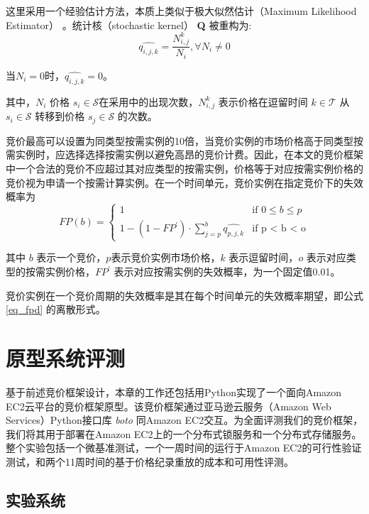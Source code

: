 这里采用一个经验估计方法，本质上类似于极大似然估计（Maximum Likelihood Estimator） \cite{Barbu:2008:SCH:1481376}。统计核（stochastic kernel） \textbf{Q} 被重构为:
\begin{equation}
\widehat{{q}_{i,j,k}} = \frac{N_{i, j}^{k}}{N_i}, \forall N_i \neq 0
\end{equation}

当$N_i = 0$时，$\widehat{{q}_{i,j,k}} = 0$。

其中，$N_i$ 价格 $s_i \in \mathcal{S}$在采用中的出现次数，$N_{i, j}^{k}$ 表示价格在逗留时间 $k \in \mathcal{T}$ 从 $s_i \in \mathcal{S}$ 转移到价格 $s_j \in \mathcal{S}$ 的次数。

竞价最高可以设置为同类型按需实例的10倍，当竞价实例的市场价格高于同类型按需实例时，应选择选择按需实例以避免高昂的竞价计费。因此，在本文的竞价框架中一个合法的竞价不应超过其对应类型的按需实例，价格等于对应按需实例价格的竞价视为申请一个按需计算实例。在一个时间单元，竞价实例在指定竞价下的失效概率为
\begin{equation}
FP(b) = 
\begin{cases}
1 &\mbox{if $0 \leq b \leq p$}\\
1 - (1 - FP^{\prime}) \cdot \sum\limits_{j=p}^b{\widehat{{q}_{p, j, k}}} &\mbox{if p < b < o}
\end{cases}
\end{equation}

其中 $b$ 表示一个竞价，$p$表示竞价实例市场价格，$k$ 表示逗留时间，$o$ 表示对应类型的按需实例价格，$FP^{\prime}$ 表示对应按需实例的失效概率，为一个固定值0.01。

竞价实例在一个竞价周期的失效概率是其在每个时间单元的失效概率期望，即公式 \eqref{eq_fpd} 的离散形式。

\section{原型系统评测}
\label{sec:jupiter-evaluation}
基于前述竞价框架设计，本章的工作还包括用Python实现了一个面向Amazon EC2云平台的竞价框架原型。该竞价框架通过亚马逊云服务（Amazon Web Services）Python接口库 \emph{boto} \cite{boto:2014} 同Amazon EC2交互。为全面评测我们的竞价框架，我们将其用于部署在Amazon EC2上的一个分布式锁服务和一个分布式存储服务。整个实验包括一个微基准测试，一个一周时间的运行于Amazon EC2的可行性验证测试，和两个11周时间的基于价格纪录重放的成本和可用性评测。

\subsection{实验系统}
\label{subsec:jupiter-bc}

